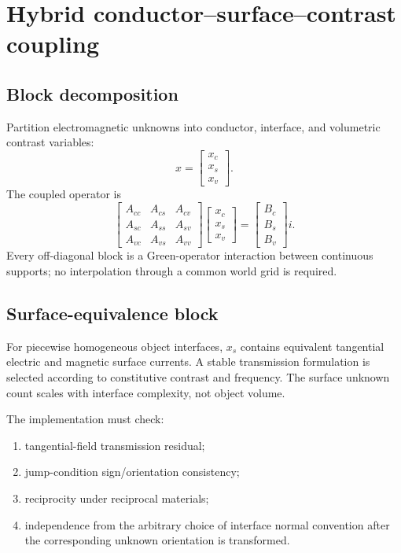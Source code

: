 \section{Hybrid conductor--surface--contrast coupling}
\label{sec:hybrid-media}

\subsection{Block decomposition}

Partition electromagnetic unknowns into conductor, interface, and volumetric
contrast variables:
\[
 x=
 \begin{bmatrix}
  x_c\\x_s\\x_v
 \end{bmatrix}.
\]
The coupled operator is
\[
 \begin{bmatrix}
  A_{cc} & A_{cs} & A_{cv}\\
  A_{sc} & A_{ss} & A_{sv}\\
  A_{vc} & A_{vs} & A_{vv}
 \end{bmatrix}
 \begin{bmatrix}
  x_c\\x_s\\x_v
 \end{bmatrix}
 =
 \begin{bmatrix}
  B_c\\B_s\\B_v
 \end{bmatrix}i .
 \label{eq:hybrid-block}
\]
Every off-diagonal block is a Green-operator interaction between continuous
supports; no interpolation through a common world grid is required.

\subsection{Surface-equivalence block}

For piecewise homogeneous object interfaces, $x_s$ contains equivalent
tangential electric and magnetic surface currents. A stable transmission
formulation is selected according to constitutive contrast and frequency. The
surface unknown count scales with interface complexity, not object volume.

The implementation must check:
\begin{enumerate}
\item tangential-field transmission residual;
\item jump-condition sign/orientation consistency;
\item reciprocity under reciprocal materials;
\item independence from the arbitrary choice of interface normal convention
      after the corresponding unknown orientation is transformed.
\end{enumerate}

